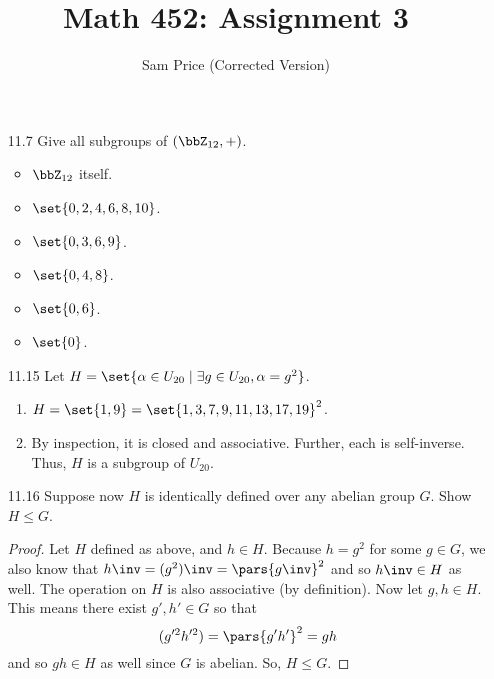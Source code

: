 \documentclass{article}
\author{Sam Price (Corrected Version)}
\date{}
\title{Math 452: Assignment 3}
\begin{document}
\maketitle

\begin{enumerate}
  \item[11.7\rparen] Give all subgroups of $(\bbZ_{12}, +)$.
        \begin{itemize}
          \item $\bbZ_{12}$ itself.
          \item $\set{0, 2, 4, 6, 8, 10}$.
          \item $\set{0, 3, 6, 9}$.
          \item $\set{0, 4, 8}$.
          \item $\set{0, 6}$.
          \item $\set{0}$.
        \end{itemize}
  \item[11.15\rparen] Let $H = \set{\alpha \in U_{20} \mid \exists g \in U_{20}, \alpha = g^{2} }$.
        \begin{enumerate}
          \item $H = \set{1, 9} = \set{1, 3, 7, 9, 11, 13, 17, 19}^{2}$.
          \item By inspection, it is closed and associative.
                Further, each is self-inverse.
                Thus, $H$ is a subgroup of $U_{20}$.
        \end{enumerate}

  \item[11.16\rparen] Suppose now $H$ is identically defined over any abelian group $G$.
        Show $H \le G$.
        \begin{proof}
          Let $H$ defined as above, and $h \in H$.
          Because $h = g^{2}$ for some $g \in G$,
          we also know that $h\inv = (g^{2})\inv = \pars{g\inv}^{2}$ and so $h\inv \in H$ as well.
          The operation on $H$ is also associative (by definition). Now let $g, h \in H$.
          This means there exist $g', h' \in G$ so that
          \[ (g'^{2}h'^{2}) = \pars{g'h'}^{2} = gh \]
          and so $gh \in H$ as well since $G$ is abelian.
          So, $H \le G$.
        \end{proof}


\end{enumerate}
\end{document}
